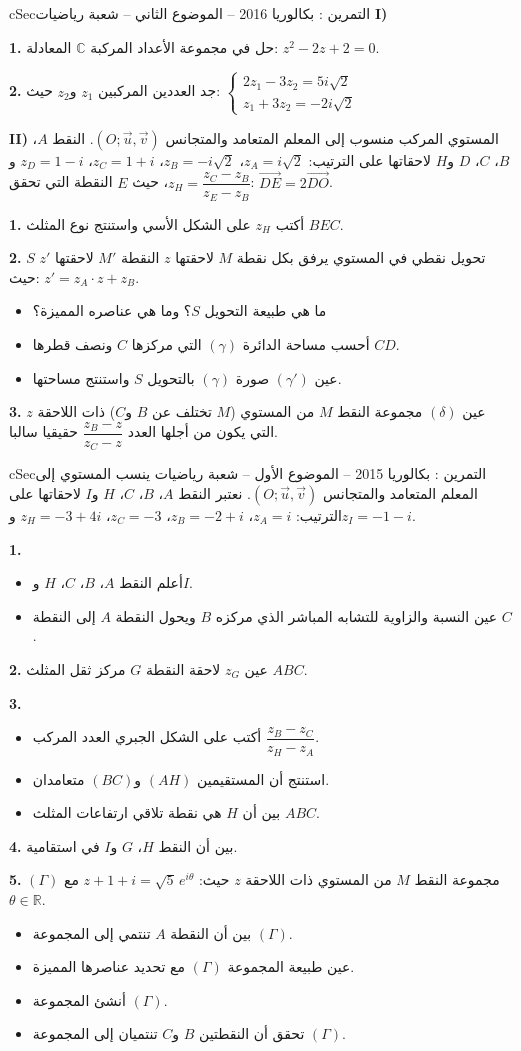 \documentclass[12pt,a4paper]{article}
\newenvironment{BOX}[2]{\begin{otherlanguage}{english}\begin{arbox}{#1}{#2}}{\end{arbox}\end{otherlanguage}}
\newcounter{exo}
\newenvironment{tamrin}[1]{\stepcounter{exo}\begin{BOX}{cSec}{التمرين \theexo: #1}}{\end{BOX}}
\newenvironment{sq}{\begin{itemize}[leftmargin=2.4em,itemsep=3pt]}{\end{itemize}}
\newcommand{\qa}{\item[(أ)]}\newcommand{\qb}{\item[(ب)]}\newcommand{\qc}{\item[(جـ)]}\newcommand{\qd}{\item[(د)]}\newcommand{\qe}{\item[(هـ)]}
\newcommand{\QQ}[1]{\par\smallskip\textbf{#1.} }
\begin{document}
\begin{tamrin}{بكالوريا 2016 -- الموضوع الثاني -- شعبة رياضيات}
\textbf{I)}\QQ{1} حل في مجموعة الأعداد المركبة $\mathbb{C}$ المعادلة: $z^2-2z+2=0$.

\QQ{2} جد العددين المركبين $z_1$ و$z_2$ حيث: $\begin{cases}2z_1-3z_2=5i\sqrt2\\ z_1+3z_2=-2i\sqrt2\end{cases}$

\textbf{II)} المستوي المركب منسوب إلى المعلم المتعامد والمتجانس $\left(O;\vec u,\vec v\right)$.
النقط $A$، $B$، $C$، $D$ و$H$ لاحقاتها على الترتيب: $z_A=i\sqrt2$، $z_B=-i\sqrt2$، $z_C=1+i$، $z_D=1-i$ و$z_H=\dfrac{z_C-z_B}{z_E-z_B}$،
حيث $E$ النقطة التي تحقق: $\overrightarrow{DE}=2\overrightarrow{DO}$.

\QQ{1} أكتب $z_H$ على الشكل الأسي واستنتج نوع المثلث $BEC$.

\QQ{2} $S$ تحويل نقطي في المستوي يرفق بكل نقطة $M$ لاحقتها $z$ النقطة $M'$ لاحقتها $z'$ حيث: $z'=z_A\cdot z+z_B$.
\begin{sq}
\qa ما هي طبيعة التحويل $S$؟ وما هي عناصره المميزة؟
\qb أحسب مساحة الدائرة $(\gamma)$ التي مركزها $C$ ونصف قطرها $CD$.
\qc عين $(\gamma')$ صورة $(\gamma)$ بالتحويل $S$ واستنتج مساحتها.
\end{sq}
\QQ{3} عين $(\delta)$ مجموعة النقط $M$ من المستوي ($M$ تختلف عن $B$ و$C$) ذات اللاحقة $z$ التي يكون من أجلها العدد $\dfrac{z_B-z}{z_C-z}$ حقيقيا سالبا.
\end{tamrin}

\begin{tamrin}{بكالوريا 2015 -- الموضوع الأول -- شعبة رياضيات}
ينسب المستوي إلى المعلم المتعامد والمتجانس $\left(O;\vec u,\vec v\right)$. نعتبر النقط $A$، $B$، $C$، $H$ و$I$ لاحقاتها على الترتيب:
$z_A=i$، $z_B=-2+i$، $z_C=-3$، $z_H=-3+4i$ و$z_I=-1-i$.

\QQ{1}
\begin{sq}
\qa أعلم النقط $A$، $B$، $C$، $H$ و$I$.
\qb عين النسبة والزاوية للتشابه المباشر الذي مركزه $B$ ويحول النقطة $A$ إلى النقطة $C$.
\end{sq}
\QQ{2} عين $z_G$ لاحقة النقطة $G$ مركز ثقل المثلث $ABC$.

\QQ{3}
\begin{sq}
\qa أكتب على الشكل الجبري العدد المركب $\dfrac{z_B-z_C}{z_H-z_A}$.
\qb استنتج أن المستقيمين $(AH)$ و$(BC)$ متعامدان.
\qc بين أن $H$ هي نقطة تلاقي ارتفاعات المثلث $ABC$.
\end{sq}
\QQ{4} بين أن النقط $H$، $G$ و$I$ في استقامية.

\QQ{5} $(\Gamma)$ مجموعة النقط $M$ من المستوي ذات اللاحقة $z$ حيث: $z+1+i=\sqrt5\,e^{i\theta}$ مع $\theta\in\mathbb{R}$.
\begin{sq}
\qa بين أن النقطة $A$ تنتمي إلى المجموعة $(\Gamma)$.
\qb عين طبيعة المجموعة $(\Gamma)$ مع تحديد عناصرها المميزة.
\qc أنشئ المجموعة $(\Gamma)$.
\qd تحقق أن النقطتين $B$ و$C$ تنتميان إلى المجموعة $(\Gamma)$.
\end{sq}
\end{tamrin}
\end{document}
